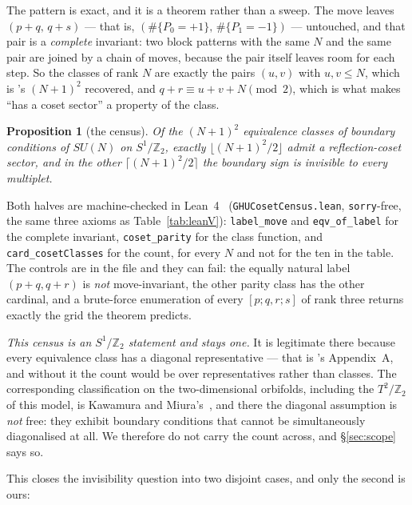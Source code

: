 \documentclass[11pt,a4paper]{article}
\newtheorem{proposition}{Proposition}
\newcommand{\ZZ}{\mathbb{Z}}
\begin{document}
\noindent The pattern is exact, and it is a theorem rather than a sweep. The move leaves
$(p+q,\,q+s)$ --- that is, $(\#\{P_0=+1\},\,\#\{P_1=-1\})$ --- untouched, and that pair is a
\emph{complete} invariant: two block patterns with the same $N$ and the same pair are joined by a
chain of moves, because the pair itself leaves room for each step. So the classes of rank $N$ are
exactly the pairs $(u,v)$ with $u,v\le N$, which is \cite{HHK}'s $(N+1)^2$ recovered, and
$q+r\equiv u+v+N \pmod 2$, which is what makes ``has a coset sector'' a property of the class.

\begin{proposition}[the census]\label{prop:census}
Of the $(N+1)^2$ equivalence classes of boundary conditions of $SU(N)$ on $S^1/\ZZ_2$, exactly
$\lfloor (N+1)^2/2\rfloor$ admit a reflection-coset sector, and in the other
$\lceil (N+1)^2/2\rceil$ the boundary sign is invisible to \emph{every} multiplet.
\end{proposition}

\noindent Both halves are machine-checked in Lean~4~\cite{Lean4}
(\texttt{GHUCosetCensus.lean}, \texttt{sorry}-free, the same three axioms as
Table~\ref{tab:leanV}): \texttt{label\_move} and \texttt{eqv\_of\_label} for the complete invariant,
\texttt{coset\_parity} for the class function, and \texttt{card\_cosetClasses} for the count, for
every $N$ and not for the ten in the table. The controls are in the file and they can fail: the
equally natural label $(p+q,q+r)$ is \emph{not} move-invariant, the other parity class has the other
cardinal, and a brute-force enumeration of every $[p;q,r;s]$ of rank three returns exactly the grid
the theorem predicts.

\emph{This census is an $S^1/\ZZ_2$ statement and stays one.} It is legitimate there because every
equivalence class has a diagonal representative --- that is \cite{HHK}'s Appendix~A, and without it
the count would be over representatives rather than classes. The corresponding classification on the
two-dimensional orbifolds, including the $T^2/\ZZ_2$ of this model, is Kawamura and
Miura's~\cite{KM}, and there the diagonal assumption is \emph{not} free: they exhibit boundary
conditions that cannot be simultaneously diagonalised at all. We therefore do not carry the count
across, and \S\ref{sec:scope} says so.

This closes the invisibility question into two disjoint cases, and only the second is ours:

\begin{center}
\end{center}
\end{document}
